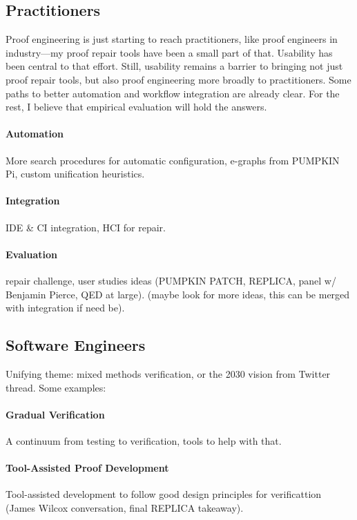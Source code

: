 \subsection*{Practitioners}

Proof engineering is just starting to reach practitioners, like proof engineers in industry---my proof repair tools have been a small part of that.
Usability has been central to that effort.
Still, usability remains a barrier to bringing not just proof repair tools, but also proof engineering 
more broadly to practitioners.
Some paths to better automation and workflow integration are already clear.
For the rest, I believe that empirical evaluation will hold the answers.

\paragraph{Automation} More search procedures for automatic configuration, e-graphs from PUMPKIN Pi, custom unification heuristics.

\paragraph{Integration} IDE \& CI integration, HCI for repair.

\paragraph{Evaluation} repair challenge, user studies ideas (PUMPKIN PATCH, REPLICA, panel w/ Benjamin Pierce, QED at large). (maybe look for more ideas, this can be merged with integration if need be).

\subsection*{Software Engineers}

Unifying theme: mixed methods verification, or the 2030 vision from Twitter thread. Some examples:

\paragraph{Gradual Verification} A continuum from testing to verification, tools to help with that.

\paragraph{Tool-Assisted Proof Development} Tool-assisted development to follow good design principles for verificattion (James Wilcox conversation, final REPLICA takeaway).

